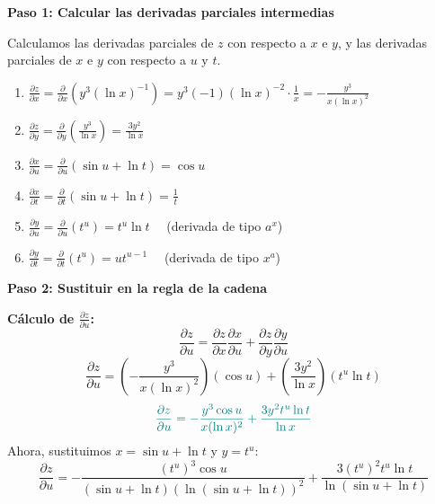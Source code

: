 \documentclass{article}
\begin{document}
\textbf{Paso 1: Calcular las derivadas parciales intermedias}

Calculamos las derivadas parciales de $z$ con respecto a $x$ e $y$, y las derivadas parciales de $x$ e $y$ con respecto a $u$ y $t$.

\begin{enumerate}
    \item $\displaystyle \frac{\partial z}{\partial x} = \frac{\partial}{\partial x} \left( y^3 (\ln x)^{-1} \right) = y^3 (-1) (\ln x)^{-2} \cdot \frac{1}{x} = -\frac{y^3}{x (\ln x)^2}$

    \item $\displaystyle \frac{\partial z}{\partial y} = \frac{\partial}{\partial y} \left( \frac{y^3}{\ln x} \right) = \frac{3y^2}{\ln x}$

    \item $\displaystyle \frac{\partial x}{\partial u} = \frac{\partial}{\partial u} (\sin u + \ln t) = \cos u$

    \item $\displaystyle \frac{\partial x}{\partial t} = \frac{\partial}{\partial t} (\sin u + \ln t) = \frac{1}{t}$

    \item $\displaystyle \frac{\partial y}{\partial u} = \frac{\partial}{\partial u} (t^u) = t^u \ln t \quad$ (derivada de tipo $a^x$)

    \item $\displaystyle \frac{\partial y}{\partial t} = \frac{\partial}{\partial t} (t^u) = u t^{u-1} \quad$ (derivada de tipo $x^a$)
\end{enumerate}

\vspace{1em}

\textbf{Paso 2: Sustituir en la regla de la cadena}

\textbf{Cálculo de $\frac{\partial z}{\partial u}$:}
\[
\frac{\partial z}{\partial u} = \frac{\partial z}{\partial x} \frac{\partial x}{\partial u} + \frac{\partial z}{\partial y} \frac{\partial y}{\partial u}
\]
\[
\frac{\partial z}{\partial u} = \left( -\frac{y^3}{x (\ln x)^2} \right) (\cos u) + \left( \frac{3y^2}{\ln x} \right) (t^u \ln t)
\]
\[ \color{teal}
\frac{\partial z}{\partial u} = -\frac{y^3 \cos u}{x (\ln x)^2} + \frac{3y^2 t^u \ln t}{\ln x}
\]
Ahora, sustituimos $x = \sin u + \ln t$ y $y = t^u$:
\[
\frac{\partial z}{\partial u} = -\frac{(t^u)^3 \cos u}{(\sin u + \ln t) (\ln(\sin u + \ln t))^2} + \frac{3(t^u)^2 t^u \ln t}{\ln(\sin u + \ln t)}
\]

\vspace{1em}
\end{document}
